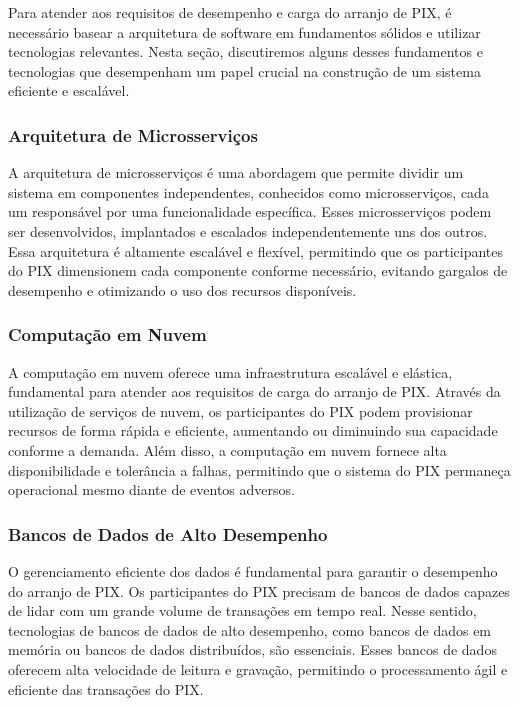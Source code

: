 \documentclass[12pt]{article}
\begin{document}
Para atender aos requisitos de desempenho e carga do arranjo de PIX, é necessário basear a arquitetura de software em fundamentos sólidos e utilizar tecnologias relevantes. Nesta seção, discutiremos alguns desses fundamentos e tecnologias que desempenham um papel crucial na construção de um sistema eficiente e escalável.

\subsubsection{Arquitetura de Microsserviços} \label{sec:tecnologia}

A arquitetura de microsserviços é uma abordagem que permite dividir um sistema em componentes independentes, conhecidos como microsserviços, cada um responsável por uma funcionalidade específica. Esses microsserviços podem ser desenvolvidos, implantados e escalados independentemente uns dos outros. Essa arquitetura é altamente escalável e flexível, permitindo que os participantes do PIX dimensionem cada componente conforme necessário, evitando gargalos de desempenho e otimizando o uso dos recursos disponíveis.

\subsubsection{Computação em Nuvem} \label{sec:tecnologia}

A computação em nuvem oferece uma infraestrutura escalável e elástica, fundamental para atender aos requisitos de carga do arranjo de PIX. Através da utilização de serviços de nuvem, os participantes do PIX podem provisionar recursos de forma rápida e eficiente, aumentando ou diminuindo sua capacidade conforme a demanda. Além disso, a computação em nuvem fornece alta disponibilidade e tolerância a falhas, permitindo que o sistema do PIX permaneça operacional mesmo diante de eventos adversos.

\subsubsection{Bancos de Dados de Alto Desempenho} \label{sec:tecnologia}

O gerenciamento eficiente dos dados é fundamental para garantir o desempenho do arranjo de PIX. Os participantes do PIX precisam de bancos de dados capazes de lidar com um grande volume de transações em tempo real. Nesse sentido, tecnologias de bancos de dados de alto desempenho, como bancos de dados em memória ou bancos de dados distribuídos, são essenciais. Esses bancos de dados oferecem alta velocidade de leitura e gravação, permitindo o processamento ágil e eficiente das transações do PIX.
\end{document}
